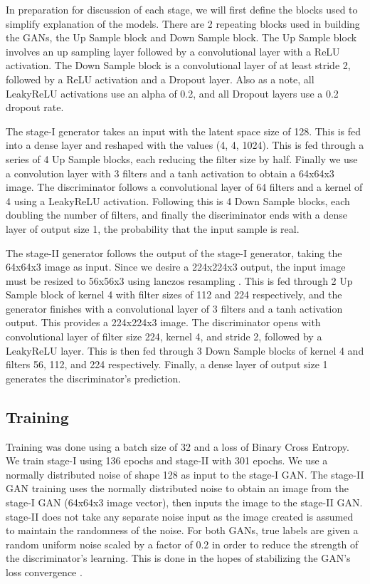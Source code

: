 \documentclass{article}
\begin{document}
	In preparation for discussion of each stage, we will first define the blocks used to simplify explanation of the models. There are 2 repeating blocks used in building the GANs, the Up Sample block and Down Sample block. The Up Sample block involves an up sampling layer followed by a convolutional layer with a ReLU activation. The Down Sample block is a convolutional layer of at least stride 2, followed by a ReLU activation and a Dropout layer. Also as a note, all LeakyReLU activations use an alpha of 0.2, and all Dropout layers use a 0.2 dropout rate.

	The stage-I generator takes an input with the latent space size of 128. This is fed into a dense layer and reshaped with the values (4, 4, 1024). This is fed through a series of 4 Up Sample blocks, each reducing the filter size by half. Finally we use a convolution layer with 3 filters and a tanh activation to obtain a 64x64x3 image. The discriminator follows a convolutional layer of 64 filters and a kernel of 4 using a LeakyReLU activation. Following this is 4 Down Sample blocks, each doubling the number of filters, and finally the discriminator ends with a dense layer of output size 1, the probability that the input sample is real.

	The stage-II generator follows the output of the stage-I generator, taking the 64x64x3 image as input. Since we desire a 224x224x3 output, the input image must be resized to 56x56x3 using lanczos resampling \cite{lanczos}. This is fed through 2 Up Sample block of kernel 4 with filter sizes of 112 and 224 respectively, and the generator finishes with a convolutional layer of 3 filters  and a tanh activation output. This provides a 224x224x3 image. The discriminator opens with convolutional layer of filter size 224, kernel 4, and stride 2, followed by a LeakyReLU layer. This is then fed through 3 Down Sample blocks of kernel 4 and filters 56, 112, and 224 respectively. Finally, a dense layer of output size 1 generates the discriminator’s prediction.

	\subsection{Training}
	Training was done using a batch size of 32 and a loss of Binary Cross Entropy. We train stage-I using 136 epochs and stage-II with 301 epochs. We use a normally distributed noise of shape 128 as input to the stage-I GAN. The stage-II GAN training uses the normally distributed noise to obtain an image from the stage-I GAN (64x64x3 image vector), then inputs the image to the stage-II GAN. stage-II does not take any separate noise input as the image created is assumed to maintain the randomness of the noise.  For both GANs, true labels are given a random uniform noise scaled by a factor of 0.2 in order to reduce the strength of the discriminator’s learning. This is done in the hopes of stabilizing the GAN’s loss convergence \cite{salimans2016improved}.
\end{document}

